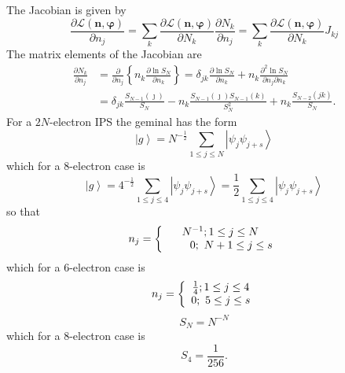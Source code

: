 \documentclass[aps,preprint]{revtex4}%
\begin{document}
The Jacobian is given by
\begin{equation}
\frac{\partial\mathcal{L}\left(  \mathbf{n,\varphi}\right)  }{\partial n_{j}%
}=\sum_{k}\frac{\partial\mathcal{L}\left(  \mathbf{n,\varphi}\right)
}{\partial N_{k}}\frac{\partial N_{k}}{\partial n_{j}}=\sum_{k}\frac
{\partial\mathcal{L}\left(  \mathbf{n,\varphi}\right)  }{\partial N_{k}}J_{kj}%
\end{equation}
The matrix elements of the Jacobian are
\begin{align}
\frac{\partial N_{k}}{\partial n_{j}}  &  =\frac{\partial}{\partial n_{j}%
}\left\{  n_{k}\frac{\partial\ln S_{N}}{\partial n_{k}}\right\}  =\delta
_{jk}\frac{\partial\ln S_{N}}{\partial n_{k}}+n_{k}\frac{\partial^{2}\ln
S_{N}}{\partial n_{j}\partial n_{k}}\\
&  =\delta_{jk}\frac{S_{N-1}\left(  \jmath\right)  }{S_{N}}-n_{k}\frac
{S_{N-1}\left(  \jmath\right)  S_{N-1}\left(  k\right)  }{S_{N}^{2}}%
+n_{k}\frac{S_{N-2}\left(  jk\right)  }{S_{N}}.\nonumber
\end{align}
For a $2N$-electron IPS the geminal has the form
\begin{equation}
\left\vert g\right\rangle =N^{-\frac{1}{2}}\sum_{1\leq j\leq N}\left\vert
\psi_{j}\psi_{j+s}\right\rangle
\end{equation}
which for a $8$-electron case is
\begin{equation}
\left\vert g\right\rangle =4^{-\frac{1}{2}}\sum_{1\leq j\leq4}\left\vert
\psi_{j}\psi_{j+s}\right\rangle =\frac{1}{2}\sum_{1\leq j\leq4}\left\vert
\psi_{j}\psi_{j+s}\right\rangle
\end{equation}
so that
\begin{equation}
n_{j}=\left\{
\begin{array}
[c]{c}%
N^{-1};1\leq j\leq N\\
\qquad0;\text{ }N+1\leq j\leq s
\end{array}
\right.
\end{equation}
which for a $6$-electron case is%
\begin{equation}
n_{j}=\left\{
\begin{array}
[c]{c}%
\frac{1}{4};1\leq j\leq4\\
0;\text{ }5\leq j\leq s
\end{array}
\right.
\end{equation}%
\begin{equation}
S_{N}=N^{-N}%
\end{equation}
which for a $8$-electron case is%
\begin{equation}
S_{4}=\frac{1}{256}.
\end{equation}
\end{document}
